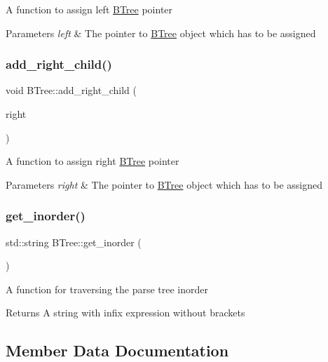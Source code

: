 A function to assign left \hyperlink{classBTree}{B\+Tree} pointer 
\begin{DoxyParams}{Parameters}
{\em left} & The pointer to \hyperlink{classBTree}{B\+Tree} object which has to be assigned \\
\hline
\end{DoxyParams}
\mbox{\label{classBTree_a03ed2114a3f21b5f1b6b0ae93d7cdc91}} 
\subsubsection{\texorpdfstring{add\+\_\+right\+\_\+child()}{add\_right\_child()}}
{\footnotesize\ttfamily void B\+Tree\+::add\+\_\+right\+\_\+child (\begin{DoxyParamCaption}\item[{\hyperlink{classBTree}{B\+Tree} $\ast$}]{right }\end{DoxyParamCaption})}

A function to assign right \hyperlink{classBTree}{B\+Tree} pointer 
\begin{DoxyParams}{Parameters}
{\em right} & The pointer to \hyperlink{classBTree}{B\+Tree} object which has to be assigned \\
\hline
\end{DoxyParams}
\mbox{\label{classBTree_a408f4bcf02423637c7132bcc44646f01}} 
\subsubsection{\texorpdfstring{get\+\_\+inorder()}{get\_inorder()}}
{\footnotesize\ttfamily std\+::string B\+Tree\+::get\+\_\+inorder (\begin{DoxyParamCaption}{ }\end{DoxyParamCaption})}

A function for traversing the parse tree inorder \begin{DoxyReturn}{Returns}
A string with infix expression without brackets 
\end{DoxyReturn}


\subsection{Member Data Documentation}
\mbox{\label{classBTree_ad7e7d928a099c40fbd0d323f76d7cf18}} 
